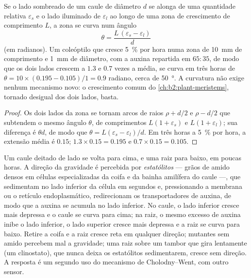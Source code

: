 \begin{theorem}\label{thm:b2:plant-plasticity:bend}
Se o lado sombreado de um caule de diâmetro $d$ se alonga de uma
quantidade relativa $\varepsilon_s$ e o lado iluminado de
$\varepsilon_l$ ao longo de uma zona de crescimento de comprimento $L$,
a zona se curva num ângulo
\[
\theta = \frac{L\,(\varepsilon_s - \varepsilon_l)}{d}
\]
(em radianos). Um coleóptilo que cresce \qty{5}{\%} por hora numa zona
de \qty{10}{mm} de comprimento e \qty{1}{mm} de diâmetro, com a auxina
repartida em
$65 : 35$, de modo que os dois lados crescem a $1.3$ e $0.7$ vezes a
média, se curva em três horas de $\theta = 10\times(0.195 - 0.105)/1 =
0.9$ radiano, cerca de \qty{50}{\degree}. A curvatura não exige nenhum
mecanismo novo: o crescimento comum do \cref{ch:b2:plant-meristems}, tornado desigual dos
dois lados, basta.
\end{theorem}
\begin{proof}
Os dois lados da zona se tornam arcos de raios $\rho + d/2$ e
$\rho - d/2$ que subtendem o mesmo ângulo $\theta$, de comprimentos
$L(1 +
\varepsilon_s)$ e $L(1 + \varepsilon_l)$; sua diferença é
$\theta d$, de modo que $\theta = L(\varepsilon_s - \varepsilon_l)/d$.
Em três horas a \qty{5}{\%} por hora, a extensão média é $0.15$;
$1.3\times 0.15 = 0.195$ e $0.7\times 0.15 = 0.105$.
\end{proof}

\begin{proposition}[Gravitropismo]\label{prop:b2:plant-plasticity:gravitropism}
Um caule deitado de lado se volta para cima, e uma raiz para baixo, em
poucas horas. A direção da gravidade é percebida por
\emph{estatólitos} --- grãos de amido densos em células especializadas
da coifa e da bainha amilífera do caule ---, que sedimentam no lado
inferior da célula em segundos e, pressionando a membrana ou o retículo
endoplasmático, redirecionam os transportadores de auxina, de modo que
a auxina se acumula no lado inferior. No caule, o lado inferior cresce
mais depressa e o caule se curva para cima; na raiz, o mesmo excesso de
auxina inibe o lado inferior, o lado superior cresce mais depressa e a
raiz se curva para baixo. Retire a coifa e a raiz cresce reta em
qualquer direção; mutantes sem amido percebem mal a gravidade; uma raiz
sobre um tambor que gira lentamente (um clinostato), que nunca deixa os
estatólitos sedimentarem, cresce sem direção. A resposta é um segundo
uso do mecanismo de Cholodny--Went, com outro sensor.
\end{proposition}

